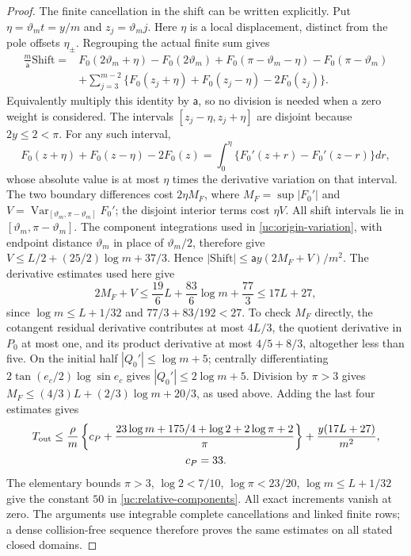 \begin{proof}
The finite cancellation in the shift can be written explicitly.
Put $\eta=\vartheta_m t=y/m$ and $z_j=\vartheta_m j$.
Here $\eta$ is a local displacement, distinct from the pole offsets $\eta_\pm$.
Regrouping the actual finite sum gives
\[
 \begin{aligned}
 \frac {m} {\mathsf{a}}\mathrm{Shift}={}&F_0(2\vartheta_m+\eta)-F_0(2\vartheta_m)
       +F_0(\pi-\vartheta_m-\eta)-F_0(\pi-\vartheta_m)\\
 &+\sum_{j=3}^{m-2}
       \{F_0(z_j+\eta)+F_0(z_j-\eta)-2F_0(z_j)\}.
 \end{aligned}
\]
Equivalently multiply this identity by $\mathsf{a}$, so no division is needed
when a zero weight is considered. The intervals
$[z_j-\eta,z_j+\eta]$ are disjoint because $2y\leq2<\pi$.
For any such interval,
\[
 F_0(z+\eta)+F_0(z-\eta)-2F_0(z)
 =\int_0^\eta\{F_0'(z+r)-F_0'(z-r)\}dr,
\]
whose absolute value is at most $\eta$ times the derivative variation
on that interval. The two boundary differences cost $2\eta M_F$,
where $M_F=\sup|F_0'|$ and
$V=\operatorname{Var}_{[\vartheta_m,\pi-\vartheta_m]}F_0'$; the disjoint interior
terms cost $\eta V$. All shift intervals lie in
$[\vartheta_m,\pi-\vartheta_m]$. The component integrations used in
\eqref{uc:origin-variation}, with endpoint distance $\vartheta_m$ in place of
$\vartheta_m/2$, therefore give
$V\leq L/2+(25/2)\log m+37/3$.
Hence $|\mathrm{Shift}|\leq \mathsf{a}y(2M_F+V)/m^2$.
The derivative estimates used here give
\[
 2M_F+V\leq\frac{19}{6}L+\frac{83}{6}\log m+\frac{77}{3}
 \leq17L+27,
\]
since $\log m\leq L+1/32$ and $77/3+83/192<27$.
To check $M_F$ directly, the cotangent residual derivative contributes
at most $4L/3$, the quotient derivative in $P_0$ at most one, and
its product derivative at most $4/5+8/3$, altogether less than five.
On the initial half $|Q_0'|\leq\log m+5$; centrally differentiating
$2\tan(e_c/2)\log\sin e_c$ gives $|Q_0'|\leq2\log m+5$.
Division by $\pi>3$ gives
$M_F\leq(4/3)L+(2/3)\log m+20/3$, as used above.
Adding the last four estimates gives
\[
 \begin{gathered}
 T_{\rm out}\leq\frac\rho m
 \left\{c_P+\frac{23\log m+175/4+\log2+2\log\pi+2}\pi\right\}
                  +\frac{y(17L+27)}{m^2},\\ c_P=33.
 \end{gathered}
\]
The elementary bounds $\pi>3$, $\log2<7/10$,
$\log\pi<23/20$, $\log m\leq L+1/32$ give the constant $50$
in \eqref{uc:relative-components}. All exact increments vanish at
zero. The arguments use integrable complete cancellations and linked
finite rows; a dense collision-free sequence therefore proves the
same estimates on all stated closed domains.


\end{proof}
